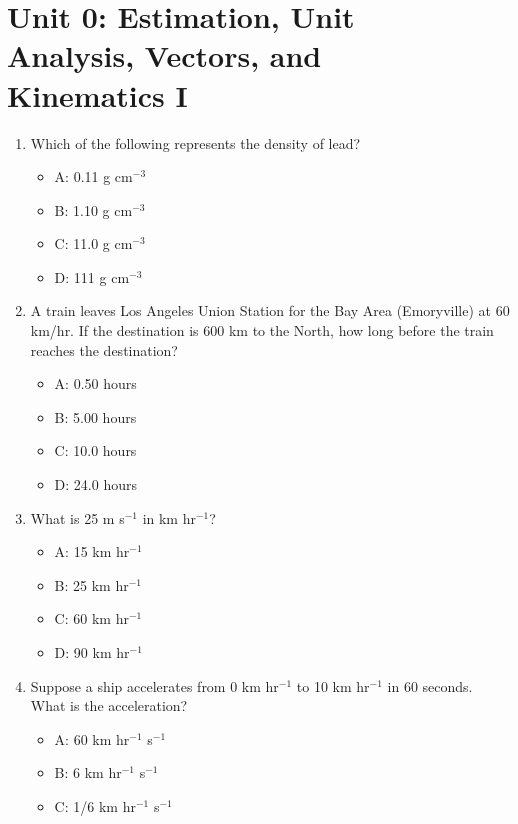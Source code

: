 \documentclass[10pt]{article}
\begin{document}
\twocolumn

\maketitle

\section{Unit 0: Estimation, Unit \\ Analysis, Vectors, and \\ Kinematics I}

\begin{enumerate}
\item Which of the following represents the density of lead?
\begin{itemize}
\item A: 0.11 g cm$^{-3}$
\item B: 1.10 g cm$^{-3}$
\item C: 11.0 g cm$^{-3}$
\item D: 111 g cm$^{-3}$
\end{itemize}
\item A train leaves Los Angeles Union Station for the Bay Area (Emoryville) at 60 km/hr.  If the destination is 600 km to the North, how long before the train reaches the destination?
\begin{itemize}
\item A: 0.50 hours
\item B: 5.00 hours
\item C: 10.0 hours
\item D: 24.0 hours
\end{itemize}
\item What is 25 m s$^{-1}$ in km hr$^{-1}$?
\begin{itemize}
\item A: 15 km hr$^{-1}$
\item B: 25 km hr$^{-1}$
\item C: 60 km hr$^{-1}$
\item D: 90 km hr$^{-1}$
\end{itemize}
\item Suppose a ship accelerates from 0 km hr$^{-1}$ to 10 km hr$^{-1}$ in 60 seconds.  What is the acceleration?
\begin{itemize}
\item A: 60 km hr$^{-1}$ s$^{-1}$
\item B: 6 km hr$^{-1}$ s$^{-1}$
\item C: 1/6 km hr$^{-1}$ s$^{-1}$

\end{itemize}
\end{enumerate}
\end{document}
